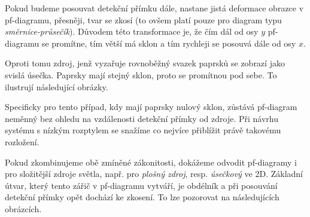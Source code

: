 Pokud budeme posouvat detekční přímku dále, nastane jistá deformace obrazce v pf-diagramu, přesněji, tvar se zkosí (to ovšem platí pouze pro diagram typu \emph{směrnice-průsečík}). Důvodem této transformace je, že čím dál od osy $y$ pf-diagramu se promítne, tím větší má sklon a tím rychleji se posouvá dále od osy $x$. 


Oproti tomu zdroj, jenž vyzařuje rovnoběžný svazek paprsků se zobrazí jako svislá úsečka. Paprsky mají stejný sklon, proto se promítnou pod sebe. To ilustrují následující obrázky.



Specificky pro tento případ, kdy mají paprsky nulový sklon, zůstává pf-diagram neměnný bez ohledu na vzdálenosti detekční přímky od zdroje. Při návrhu systému s nízkým rozptylem se snažíme co nejvíce přiblížit právě takovému rozložení.

Pokud zkombinujeme obě zmíněné zákonitosti, dokážeme odvodit pf-diagramy i pro složitější zdroje světla, např. pro \emph{plošný zdroj}, resp. \emph{úsečkový} ve 2D. Základní útvar, který tento zářič v pf-diagramu vytváří, je obdélník a při posouvání detekční přímky opět dochází ke zkosení. To lze pozorovat na následujících obrázcích.


